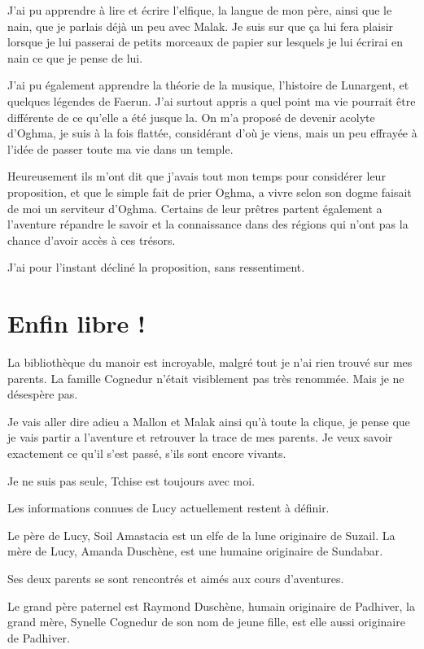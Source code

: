 \documentclass[10pt,a4paper,twoside,twocolumn,openany]{book}
\begin{document}
J'ai pu apprendre à lire et écrire l'elfique, la langue de mon père, ainsi que le nain, que je parlais
déjà un peu avec Malak. Je suis sur que ça lui fera plaisir lorsque je lui passerai de petits morceaux
de papier sur lesquels je lui écrirai en nain ce que je pense de lui.

J'ai pu également apprendre la théorie de la musique, l'histoire de Lunargent, et quelques légendes
de Faerun.
J'ai surtout appris a quel point ma vie pourrait être différente de ce qu'elle a été
jusque la. On m'a proposé de devenir acolyte d'Oghma, je suis à la fois flattée, considérant
d'où je viens, mais un peu effrayée à l'idée de passer toute ma vie dans un temple.

Heureusement ils m'ont dit que j'avais tout mon temps pour considérer leur proposition, et que le
simple fait de prier Oghma, a vivre selon son dogme faisait de moi un serviteur 
d'Oghma. Certains de leur prêtres partent également a l'aventure répandre le savoir et la connaissance
dans des régions qui n'ont pas la chance d'avoir accès à ces trésors.

J'ai pour l'instant décliné la proposition, sans ressentiment.

\section{Enfin libre !}

La bibliothèque du manoir est incroyable, malgré tout je n'ai rien trouvé sur mes parents. 
La famille Cognedur n'était visiblement pas très renommée. Mais je ne désespère pas.

Je vais aller dire adieu a Mallon et Malak ainsi qu'à toute la clique, je pense que je
vais partir a l'aventure et retrouver la trace de mes parents. Je veux savoir exactement
ce qu'il s'est passé, s'ils sont encore vivants.

Je ne suis pas seule, Tchise est toujours avec moi.

\begin{quotebox}
Les informations connues de Lucy actuellement restent à définir.

Le père de Lucy, Soil Amastacia est un elfe de la lune originaire de Suzail.
La mère de Lucy, Amanda Duschène, est une humaine originaire de Sundabar.

Ses deux parents se sont rencontrés et aimés aux cours d'aventures.

Le grand père paternel est Raymond Duschène, humain originaire de Padhiver, 
la grand mère, Synelle Cognedur de son nom de jeune fille, est elle aussi
originaire de Padhiver.
\end{quotebox}
\end{document}
